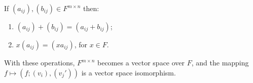If $(a_{ij}), (b_{ij}) \in F^{m \times n}$ then:
\begin{enumerate}
\item $(a_{ij}) + (b_{ij}) = (a_{ij} + b_{ij})$;
\item $x(a_{ij}) = (xa_{ij})$, for $x \in F$.
\end{enumerate}
With these operations, $F^{m \times n}$ becomes a vector space over $F$, and the mapping $f \mapsto (f; (v_i), (v_j'))$ is a vector space isomorphism.
